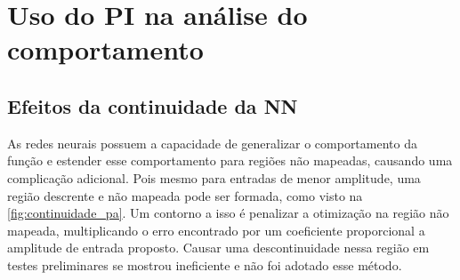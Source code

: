 
\section{Uso do PI na análise do comportamento} \label{sec:estudoi-pi}

\subsection{Efeitos da continuidade da NN} \label{subsec:estudoi-pi-conti}
As redes neurais possuem a capacidade de generalizar o comportamento da função e estender esse comportamento para regiões não mapeadas, causando uma complicação adicional. Pois mesmo para entradas de menor amplitude, uma região descrente e não mapeada pode ser formada, como visto na \autoref{fig:continuidade_pa}. Um contorno a isso é penalizar a otimização na região não mapeada, multiplicando o erro encontrado por um coeficiente proporcional a amplitude de entrada proposto. Causar uma descontinuidade nessa região em testes preliminares se mostrou ineficiente e não foi adotado esse método.

